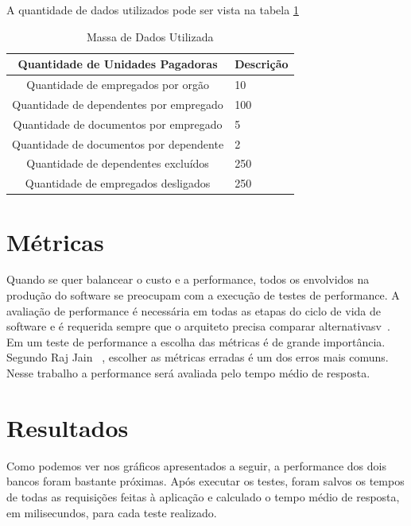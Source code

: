 A quantidade de dados utilizados pode ser vista na tabela \ref{tab:massadadosutil}

\begin{table}
	\caption{Massa de Dados Utilizada}
	\begin{center}
	\begin{tabularx}{\textwidth}{ | c | X | }
	\hline
		\textbf{Quantidade de Unidades Pagadoras} & \multicolumn{1}{c|}{\textbf{Descrição}} \\
	\hline
		Quantidade de empregados por orgão & 10\\
	\hline 
		Quantidade de dependentes por empregado & 100 \\
	\hline
		Quantidade de documentos por empregado & 5\\
	\hline
		Quantidade de documentos por dependente & 2\\
	\hline
		Quantidade de dependentes excluídos & 250\\
	\hline
		Quantidade de empregados desligados & 250\\
	\hline
	\end {tabularx}
	\end{center}
	\label{tab:massadadosutil}
\end{table}

\section{Métricas}

Quando se quer balancear o custo e a performance, todos os envolvidos na produção do software se preocupam com a execução de testes de performance. A avaliação de performance é necessária em todas as etapas do ciclo de vida de software e é requerida sempre que o arquiteto precisa comparar alternativasv~\cite{rajjain}. Em um teste de performance a escolha das métricas é de grande importância. Segundo Raj Jain ~\cite{rajjain}, escolher as métricas erradas é um dos erros mais comuns. Nesse trabalho a performance será avaliada pelo tempo médio de resposta.

\section{Resultados}

Como podemos ver nos gráficos apresentados a seguir, a performance dos dois bancos foram bastante próximas. Após executar os testes, foram salvos os tempos de todas as requisições feitas à aplicação e calculado o tempo médio de resposta, em milisecundos, para cada teste realizado.

